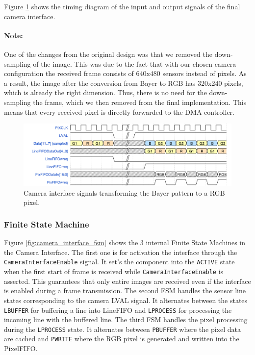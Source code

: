 \documentclass{article}
\begin{document}
Figure \ref{fig:camera_interface_signals} shows the timing diagram of the input and output signals of the final camera interface. 

\paragraph{Note:}
One of the changes from the original design was that we removed the down-sampling of the image.
This was due to the fact that with our chosen camera configuration the received frame consists of 640x480 sensors instead of pixels.
As a result, the image after the conversion from Bayer to RGB has 320x240 pixels, which is already the right dimension.
Thus, there is no need for the down-sampling the frame, which we then removed from the final implementation. This means that every received pixel is directly forwarded to the DMA controller.

\begin{figure}[H]
\centering
\includegraphics[width=\textwidth]{images/camera_interface_data_signals.png}
\caption{Camera interface signals transforming the Bayer pattern to a RGB pixel.}
\label{fig:camera_interface_signals}
\end{figure}

\subsubsection{Finite State Machine}
Figure \ref{fig:camera_interface_fsm} shows the 3 internal Finite State Machines in the Camera Interface.
The first one is for activation the interface through the \verb'CameraInterfaceEnable' signal. It set's the component into the \verb'ACTIVE' state when the first start of frame is received while \verb'CameraInterfaceEnable' is asserted. This guarantees that only entire images are received even if the interface is enabled during a frame transmission.
The second FSM handles the sensor line states corresponding to the camera LVAL signal.
It alternates between the states \verb'LBUFFER' for buffering a line into LineFIFO and \verb'LPROCESS' for processing the incoming line with the buffered line.
The third FSM handles the pixel processing during the \verb'LPROCESS' state.
It alternates between \verb'PBUFFER' where the pixel data are cached and \verb'PWRITE' where the RGB pixel is generated and written into the PixelFIFO.
\end{document}
